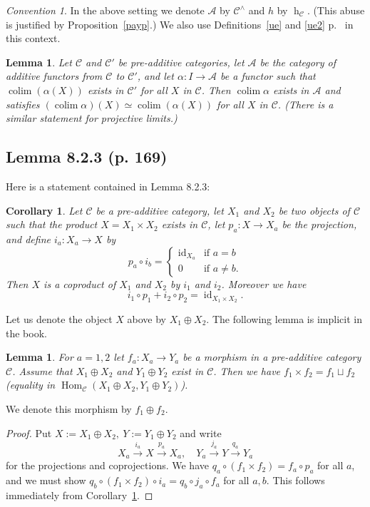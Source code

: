 \documentclass[12pt]{article}%
\newtheorem{lem}[thm]{Lemma}
\newtheorem{cor}[thm]{Corollary}
\theoremstyle{remark}
\newtheorem{conv}[thm]{Convention}%
\theoremstyle{definition}
\newcommand{\A}{\mathcal A}
\newcommand{\C}{\mathcal C}
\newcommand{\xr}{\xrightarrow}
\DeclareMathOperator*{\colim}{colim}%
\DeclareMathOperator{\hy}{h}
\DeclareMathOperator{\id}{id}
\DeclareMathOperator{\Hom}{Hom}%
\begin{document}
\begin{conv}\label{payc}
In the above setting we denote $\A$ by $\C^\wedge$ and $h$ by $\hy_\C$. (This abuse is justified by Proposition~\ref{payp}.) We also use Definitions~\ref{ue} and \ref{ue2} p.~\pageref{ue} in this context. 
\end{conv} 

\begin{lem}\label{payl}
Let $\C$ and $\C'$ be pre-additive categories, let $\A$ be the category of additive functors from $\C$ to $\C'$, and let $\alpha:I\to\A$ be a functor such that $\colim(\alpha(X))$ exists in $\C'$ for all $X$ in $\C$. Then $\colim\alpha$ exists in $\A$ and satisfies $(\colim\alpha)(X)\simeq\colim(\alpha(X))$ for all $X$ in $\C$. (There is a similar statement for projective limits.)
\end{lem}


\subsection{Lemma 8.2.3 (p. 169)}

Here is a statement contained in Lemma 8.2.3:

\begin{cor}\label{823}
Let $\C$ be a pre-additive category, let $X_1$ and $X_2$ be two objects of $\C$ such that the product $X=X_1\times X_2$ exists in $\C$, let $p_a:X\to X_a$ be the projection, and define $i_a:X_a\to X$ by 
$$
p_a\circ i_b=\begin{cases}\id_{X_a}&\text{if }a=b\\0&\text{if }a\not=b.\end{cases}
$$ 
Then $X$ is a coproduct of $X_1$ and $X_2$ by $i_1$ and $i_2$. Moreover we have 
$$
i_1\circ p_1+i_2\circ p_2=\id_{X_1\times X_2}.
$$
\end{cor}

Let us denote the object $X$ above by $X_1\oplus X_2$. The following lemma is implicit in the book. 

\begin{lem}
For $a=1,2$ let $f_a:X_a\to Y_a$ be a morphism in a pre-additive category $\C$. Assume that $X_1\oplus X_2$ and $Y_1\oplus Y_2$ exist in $\C$. Then we have $f_1\times f_2=f_1\sqcup f_2$ (equality in $\Hom_\C(X_1\oplus X_2,Y_1\oplus Y_2)$). 
\end{lem} 

We denote this morphism by $f_1\oplus f_2$.\medskip 

\begin{proof}
Put $X:=X_1\oplus X_2,\ Y:=Y_1\oplus Y_2$ and write 
$$
X_a\xr{i_a}X\xr{p_a}X_a,\quad Y_a\xr{j_a}Y\xr{q_a}Y_a
$$ 
for the projections and coprojections. We have $q_a\circ(f_1\times f_2)=f_a\circ p_a$ for all $a$, and we must show $q_b\circ (f_1\times f_2)\circ i_a=q_b\circ j_a\circ f_a$ for all $a,b$. This follows immediately from Corollary~\ref{823}.
\end{proof}
\end{document}
